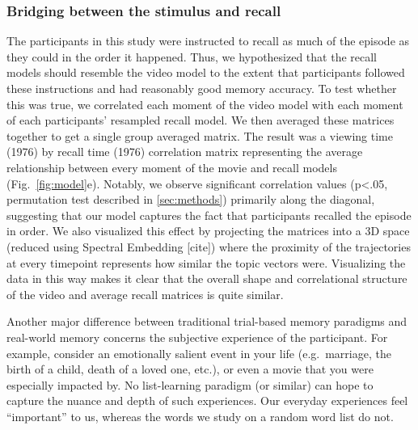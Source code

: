\subsubsection{Bridging between the stimulus and recall}
The participants in this study were instructed to recall as much of the episode as they could in the order it happened.  Thus, we hypothesized that the recall models should resemble the video model to the extent that participants followed these instructions and had reasonably good memory accuracy. To test whether this was true, we correlated each moment of the video model with each moment of each participants' resampled recall model. We then averaged these matrices together to get a single group averaged matrix.  The result was a viewing time (1976) by recall time (1976) correlation matrix representing the average relationship between every moment of the movie and recall models (Fig.~\ref{fig:model}e). Notably, we observe significant correlation values (p<.05, permutation test described in \ref{sec:methods}) primarily along the diagonal, suggesting that our model captures the fact that participants recalled the episode in order. We also visualized this effect by projecting the matrices into a 3D space (reduced using Spectral Embedding [cite]) where the proximity of the trajectories at every timepoint represents how similar the topic vectors were. Visualizing the data in this way makes it clear that the overall shape and correlational structure of the video and average recall matrices is quite similar.

Another major difference between traditional trial-based memory paradigms and real-world memory concerns the subjective experience of the participant.  For example, consider an emotionally salient event in your life (e.g.\ marriage, the birth of a child, death of a loved one, etc.), or even a movie that you were especially impacted by.  No list-learning paradigm (or similar) can hope to capture the nuance and depth of such experiences.  Our everyday experiences feel ``important'' to us, whereas the words we study on a random word list do not.  
